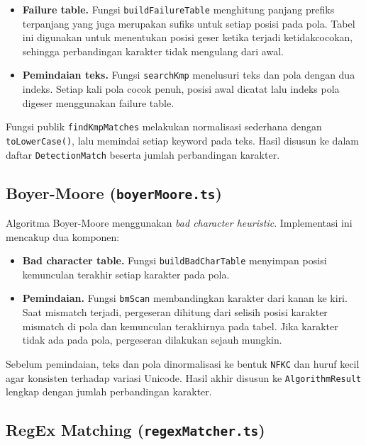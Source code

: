 \begin{itemize}
	\item \textbf{Failure table.} Fungsi \texttt{buildFailureTable} menghitung
	panjang prefiks terpanjang yang juga merupakan sufiks untuk setiap posisi
	pada pola. Tabel ini digunakan untuk menentukan posisi geser ketika
	terjadi ketidakcocokan, sehingga perbandingan karakter tidak mengulang
	dari awal.

	\item \textbf{Pemindaian teks.} Fungsi \texttt{searchKmp} menelusuri teks
	dan pola dengan dua indeks. Setiap kali pola cocok penuh, posisi awal
	dicatat lalu indeks pola digeser menggunakan failure table.
\end{itemize}

Fungsi publik \texttt{findKmpMatches} melakukan normalisasi sederhana dengan
\texttt{toLowerCase()}, lalu memindai setiap keyword pada teks. Hasil disusun
ke dalam daftar \texttt{DetectionMatch} beserta jumlah perbandingan karakter.

\subsection{Boyer-Moore (\texttt{boyerMoore.ts})}

Algoritma Boyer-Moore menggunakan \textit{bad character heuristic}.
Implementasi ini mencakup dua komponen:

\begin{itemize}
	\item \textbf{Bad character table.} Fungsi \texttt{buildBadCharTable}
	menyimpan posisi kemunculan terakhir setiap karakter pada pola.

	\item \textbf{Pemindaian.} Fungsi \texttt{bmScan} membandingkan karakter
	dari kanan ke kiri. Saat mismatch terjadi, pergeseran dihitung dari
	selisih posisi karakter mismatch di pola dan kemunculan terakhirnya pada
	tabel. Jika karakter tidak ada pada pola, pergeseran dilakukan sejauh
	mungkin.
\end{itemize}

Sebelum pemindaian, teks dan pola dinormalisasi ke bentuk \texttt{NFKC} dan
huruf kecil agar konsisten terhadap variasi Unicode. Hasil akhir disusun
ke \texttt{AlgorithmResult} lengkap dengan jumlah perbandingan karakter.

\subsection{RegEx Matching (\texttt{regexMatcher.ts})}

